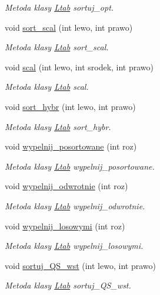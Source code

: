 \begin{DoxyCompactItemize}
\begin{DoxyCompactList}\small\item\em Metoda klasy \hyperlink{class_ltab}{Ltab} sortuj\-\_\-opt. \end{DoxyCompactList}\item 
void \hyperlink{class_ltab_a57d2fa20504b7dda2f6be20e26679aef}{sort\-\_\-scal} (int lewo, int prawo)
\begin{DoxyCompactList}\small\item\em Metoda klasy \hyperlink{class_ltab}{Ltab} sort\-\_\-scal. \end{DoxyCompactList}\item 
void \hyperlink{class_ltab_a16b62be673fff8092ec63b83c0e3bdca}{scal} (int lewo, int srodek, int prawo)
\begin{DoxyCompactList}\small\item\em Metoda klasy \hyperlink{class_ltab}{Ltab} scal. \end{DoxyCompactList}\item 
void \hyperlink{class_ltab_a414506ad786eddec135a51cce17e1edb}{sort\-\_\-hybr} (int lewo, int prawo)
\begin{DoxyCompactList}\small\item\em Metoda klasy \hyperlink{class_ltab}{Ltab} sort\-\_\-hybr. \end{DoxyCompactList}\item 
void \hyperlink{class_ltab_a503a8f38c9533941551261d3d5403ea4}{wypelnij\-\_\-posortowane} (int roz)
\begin{DoxyCompactList}\small\item\em Metoda klasy \hyperlink{class_ltab}{Ltab} wypelnij\-\_\-posortowane. \end{DoxyCompactList}\item 
void \hyperlink{class_ltab_a198bbbe58da442f53b233e2e8a7e170a}{wypelnij\-\_\-odwrotnie} (int roz)
\begin{DoxyCompactList}\small\item\em Metoda klasy \hyperlink{class_ltab}{Ltab} wypelnij\-\_\-odwrotnie. \end{DoxyCompactList}\item 
void \hyperlink{class_ltab_a7fb9b7832172a4e6ec1f4b2e2a582c63}{wypelnij\-\_\-losowymi} (int roz)
\begin{DoxyCompactList}\small\item\em Metoda klasy \hyperlink{class_ltab}{Ltab} wypelnij\-\_\-losowymi. \end{DoxyCompactList}\item 
void \hyperlink{class_ltab_acc8c695848136fdfef9099951c3a2c45}{sortuj\-\_\-\-Q\-S\-\_\-wst} (int lewo, int prawo)
\begin{DoxyCompactList}\small\item\em Metoda klasy \hyperlink{class_ltab}{Ltab} sortuj\-\_\-\-Q\-S\-\_\-wst. \end{DoxyCompactList}\end{DoxyCompactItemize}


